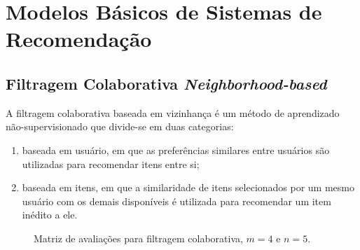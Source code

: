 \section{Modelos Básicos de Sistemas de Recomendação}
\subsection{Filtragem Colaborativa \textit{Neighborhood-based}} A filtragem
colaborativa baseada em vizinhança é um método de aprendizado não-supervisionado
que divide-se em duas categorias:
\begin{enumerate}
    \item baseada em usuário, em
que as preferências similares entre usuários são utilizadas para recomendar
itens entre si;
    \item baseada em itens, em que a similaridade de itens selecionados
por um mesmo usuário com os demais disponíveis é utilizada para recomendar um
item inédito a ele.
\end{enumerate}

\begin{figure}[h!]
    \centering
    \caption{Matriz de avaliações para filtragem colaborativa, $m=4$ e $n=5$.}
    \label{fig:ratings_matrix}
\end{figure}

